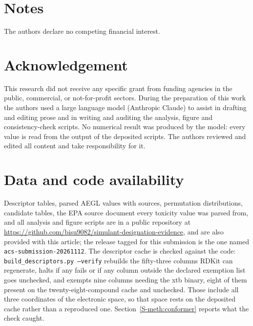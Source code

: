 \documentclass[journal=ancham,manuscript=article,margin=1in]{achemso}
\begin{document}
\section*{Notes}
The authors declare no competing financial interest.

\section*{Acknowledgement}
This research did not receive any specific grant from funding agencies in the
public, commercial, or not-for-profit sectors. During the preparation of this
work the authors used a large language model (Anthropic Claude) to assist in
drafting and editing prose and in writing and auditing the analysis, figure and
consistency-check scripts. No numerical result was produced by the model: every
value is read from the output of the deposited scripts. The authors reviewed and
edited all content and take responsibility for it.

\section*{Data and code availability}
\begingroup\sloppy
Descriptor tables, parsed AEGL values with sources, permutation distributions,
candidate tables, the EPA source document every toxicity value was parsed from,
and all analysis and figure scripts are in a public repository at
\url{https://github.com/bisu9082/simulant-designation-evidence}, and are also
provided with this article; the release tagged for this submission is the one
named \texttt{acs-submission-20261112}.
The descriptor cache is checked against the
code: \texttt{build\_descriptors.py --verify} rebuilds the fifty-three columns
RDKit can regenerate, halts if any fails or if any column outside the declared
exemption list goes unchecked, and exempts nine columns needing the xtb binary,
eight of them present on the twenty-eight-compound cache and unchecked. Those
include all three coordinates of the electronic space, so that space rests on
the deposited cache rather than a reproduced one.
Section~\ref{S-meth:conformer} reports what the check caught.
\endgroup


\end{document}
